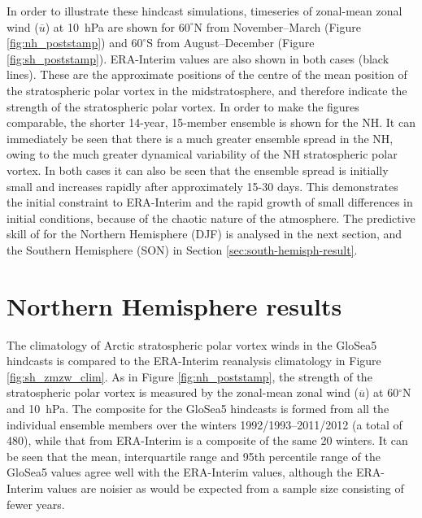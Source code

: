 In order to illustrate these hindcast simulations, timeseries of zonal-mean
zonal wind ($\overline{u}$) at 10~hPa are shown for $60^{\circ}$N from
November--March (Figure \ref{fig:nh_poststamp}) and $60^{\circ}$S from
August--December (Figure \ref{fig:sh_poststamp}). ERA-Interim values are also
shown in both cases (black lines). These are the approximate positions of the
centre of the mean position of the stratospheric polar vortex in the
midstratosphere, and therefore indicate the strength of the stratospheric polar
vortex. In order to make the figures comparable, the shorter 14-year, 15-member
ensemble is shown for the NH. It can immediately be seen that there is a much
greater ensemble spread in the NH, owing to the much greater dynamical
variability of the NH stratospheric polar vortex. In both cases it can also be
seen that the ensemble spread is initially small and increases rapidly after
approximately 15-30 days. This demonstrates the initial constraint to
ERA-Interim and the rapid growth of small differences in initial conditions,
because of the chaotic nature of the atmosphere. The predictive skill of for the
Northern Hemisphere (DJF) is analysed in the next section, and the Southern
Hemisphere (SON) in Section \ref{sec:south-hemisph-result}.


\section{Northern Hemisphere results}
\label{sec:north-hemisph-result}

The climatology of Arctic stratospheric polar vortex winds in the GloSea5
hindcasts is compared to the ERA-Interim reanalysis climatology in Figure
\ref{fig:sh_zmzw_clim}. As in Figure \ref{fig:nh_poststamp}, the strength of the
stratospheric polar vortex is measured by the zonal-mean zonal wind
($\overline{u}$) at 60$^{\circ}$N and 10~hPa. The composite for the GloSea5
hindcasts is formed from all the individual ensemble members over the winters
1992/1993--2011/2012 (a total of 480), while that from ERA-Interim is a
composite of the same 20 winters. It can be seen that the mean, interquartile
range and 95th percentile range of the GloSea5 values agree well with the
ERA-Interim values, although the ERA-Interim values are noisier as would be
expected from a sample size consisting of fewer years.

